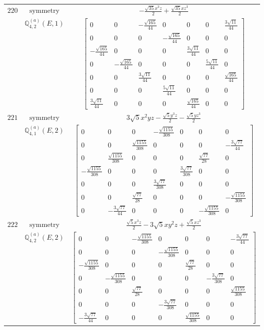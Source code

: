 \documentclass[fleqn,8pt,landscape]{jsarticle}
\begin{document}
\begin{longtable}{ccc}
$ 220 $ & $ \text{symmetry} $ & $ - \frac{\sqrt{35} x^{3} z}{2} + \frac{\sqrt{35} x z^{3}}{2} $ \\
$  $ & $ \mathbb{Q}_{4,2}^{(a)}(E,1) $ & $ \begin{bmatrix} 0 & 0 & - \frac{\sqrt{165}}{44} & 0 & 0 & 0 & \frac{3 \sqrt{11}}{44} \\ 0 & 0 & 0 & - \frac{\sqrt{165}}{44} & 0 & 0 & 0 \\ - \frac{\sqrt{165}}{44} & 0 & 0 & 0 & \frac{3 \sqrt{11}}{44} & 0 & 0 \\ 0 & - \frac{\sqrt{165}}{44} & 0 & 0 & 0 & \frac{5 \sqrt{11}}{44} & 0 \\ 0 & 0 & \frac{3 \sqrt{11}}{44} & 0 & 0 & 0 & \frac{\sqrt{165}}{44} \\ 0 & 0 & 0 & \frac{5 \sqrt{11}}{44} & 0 & 0 & 0 \\ \frac{3 \sqrt{11}}{44} & 0 & 0 & 0 & \frac{\sqrt{165}}{44} & 0 & 0 \end{bmatrix} $ \\ \hline
$ 221 $ & $ \text{symmetry} $ & $ 3 \sqrt{5} x^{2} y z - \frac{\sqrt{5} y^{3} z}{2} - \frac{\sqrt{5} y z^{3}}{2} $ \\
$  $ & $ \mathbb{Q}_{4,1}^{(a)}(E,2) $ & $ \begin{bmatrix} 0 & 0 & 0 & - \frac{\sqrt{1155}}{308} & 0 & 0 & 0 \\ 0 & 0 & \frac{\sqrt{1155}}{308} & 0 & 0 & 0 & - \frac{3 \sqrt{77}}{44} \\ 0 & \frac{\sqrt{1155}}{308} & 0 & 0 & 0 & \frac{\sqrt{77}}{28} & 0 \\ - \frac{\sqrt{1155}}{308} & 0 & 0 & 0 & \frac{3 \sqrt{77}}{308} & 0 & 0 \\ 0 & 0 & 0 & \frac{3 \sqrt{77}}{308} & 0 & 0 & 0 \\ 0 & 0 & \frac{\sqrt{77}}{28} & 0 & 0 & 0 & - \frac{\sqrt{1155}}{308} \\ 0 & - \frac{3 \sqrt{77}}{44} & 0 & 0 & 0 & - \frac{\sqrt{1155}}{308} & 0 \end{bmatrix} $ \\ \hline
$ 222 $ & $ \text{symmetry} $ & $ \frac{\sqrt{5} x^{3} z}{2} - 3 \sqrt{5} x y^{2} z + \frac{\sqrt{5} x z^{3}}{2} $ \\
$  $ & $ \mathbb{Q}_{4,2}^{(a)}(E,2) $ & $ \begin{bmatrix} 0 & 0 & - \frac{\sqrt{1155}}{308} & 0 & 0 & 0 & - \frac{3 \sqrt{77}}{44} \\ 0 & 0 & 0 & - \frac{\sqrt{1155}}{308} & 0 & 0 & 0 \\ - \frac{\sqrt{1155}}{308} & 0 & 0 & 0 & \frac{\sqrt{77}}{28} & 0 & 0 \\ 0 & - \frac{\sqrt{1155}}{308} & 0 & 0 & 0 & - \frac{3 \sqrt{77}}{308} & 0 \\ 0 & 0 & \frac{\sqrt{77}}{28} & 0 & 0 & 0 & \frac{\sqrt{1155}}{308} \\ 0 & 0 & 0 & - \frac{3 \sqrt{77}}{308} & 0 & 0 & 0 \\ - \frac{3 \sqrt{77}}{44} & 0 & 0 & 0 & \frac{\sqrt{1155}}{308} & 0 & 0 \end{bmatrix} $ \\ \hline

\end{longtable}
\end{document}
